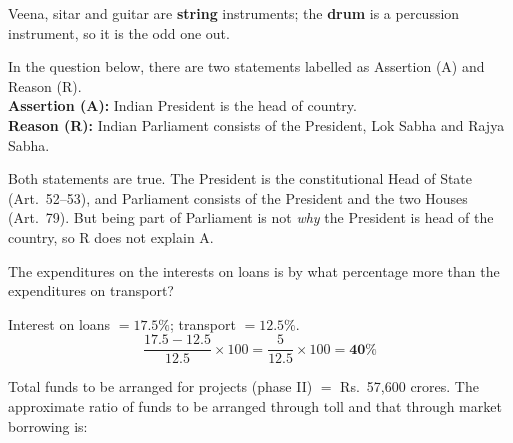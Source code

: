 Veena, sitar and guitar are \textbf{string} instruments; the \textbf{drum} is a percussion instrument, so it is the odd one out.

In the question below, there are two statements labelled as Assertion (A) and Reason (R).\\
\textbf{Assertion (A):} Indian President is the head of country.\\
\textbf{Reason (R):} Indian Parliament consists of the President, Lok Sabha and Rajya Sabha.

Both statements are true. The President is the constitutional Head of State (Art.~52--53), and Parliament consists of the President and the two Houses (Art.~79). But being part of Parliament is not \emph{why} the President is head of the country, so R does not explain A.


The expenditures on the interests on loans is by what percentage more than the expenditures on transport?

Interest on loans $=17.5\%$; transport $=12.5\%$.
\[\frac{17.5-12.5}{12.5}\times100=\frac{5}{12.5}\times100=\mathbf{40\%}\]


Total funds to be arranged for projects (phase II) $=$ Rs.~57,600 crores. The approximate ratio of funds to be arranged through toll and that through market borrowing is:

